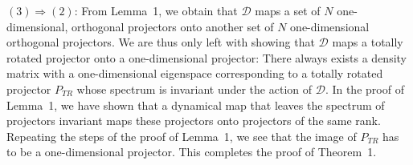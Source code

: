 $\left(3\right)\Longrightarrow\left(2\right)$:
From Lemma~1, we obtain  that $\mathcal{D}$ maps a set of $N$
one-dimensional, orthogonal projectors onto another set of $N$
one-dimensional orthogonal projectors. We are thus only left with
showing that $\mathcal{D}$ maps a totally rotated projector onto a
one-dimensional projector: There always exists a density
matrix with a one-dimensional eigenspace corresponding to a totally
rotated projector $P_{TR}$ whose spectrum is invariant under the action
of $\mathcal{D}$. In the proof of Lemma~1, we have shown that
a dynamical map that leaves the spectrum of projectors invariant
maps these projectors onto projectors of the same rank.
Repeating the steps of the proof of Lemma~1, we see that the image of
$P_{TR}$ has to be a one-dimensional projector. This completes the
proof of Theorem~1.
